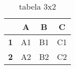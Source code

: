 \begin{table}[htbp]
\centering
\begin{tabular}{|c|c|c|c|}
\hline
  &      \textbf{A}  & \textbf{B}           &\textbf{C}           \\ \hline
  
\textbf{1} &      A1 &    B1       & C1          \\ \hline

\textbf{2} &      A2 &    B2       & C2          \\ \hline
\end{tabular}
\caption{tabela 3x2}
\label{tab:moja_tabela}
\end{table}
